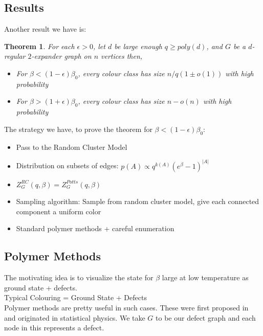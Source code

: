 \documentclass{article}
\newtheorem{theorem}{Theorem}
\begin{document}
\subsection{Results}

Another result we have is:

\begin{theorem}
    For each $\epsilon>0$, let $d$ be large enough $q \geq poly(d)$, and $G$ be a $d$-regular $2$-expander graph on $n$ vertices then,

    \begin{itemize}
        \item For $\beta < (1-\epsilon) \beta_0$, every colour class has size $n/q (1 \pm o(1))$ with high probability
        \item For $\beta > (1+\epsilon) \beta_0$, every colour class has size $n-o(n)$ with high probability
    \end{itemize}
\end{theorem}

\noindent The strategy we have, to prove the theorem for $\beta < (1-\epsilon) \beta_0$:

\begin{itemize}
    \item Pass to the Random Cluster Model
    \item Distribution on subsets of edges: $p(A) \propto q^{k(A)} (e^{\beta}-1)^{|A|}$
    \item $Z_G^{RC}(q, \beta) = Z_G^{Potts}(q, \beta)$
    \item Sampling algorithm: Sample from random cluster model, give each connected component a uniform color
    \item Standard polymer methods + careful enumeration
\end{itemize}

\subsection{Polymer Methods}

\noindent The motivating idea is to visualize the state for $\beta$ large at low temperature as ground state + defects.\\

\noindent Typical Colouring = Ground State + Defects\\

\noindent Polymer methods are pretty useful in such cases. These were first proposed in \cite{10.1145/3313276.3316305} and originated in statistical physics. We take $G$ to be our defect graph and each node in this represents a defect.\\
\end{document}
